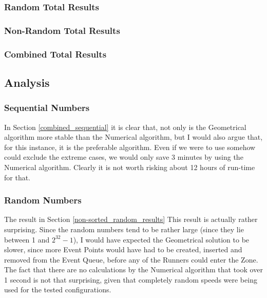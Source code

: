 \subsubsection{Random Total Results}



\subsubsection{Non-Random Total Results}



\subsubsection{Combined Total Results}
\label{total_combined_results} 


\subsection{Analysis}

\subsubsection{Sequential Numbers}
In Section \ref{combined_sequential} it is clear that, not only is the Geometrical algorithm more stable than the Numerical algorithm, but I would also argue that, for this instance, it is the preferable algorithm. Even if we were to use somehow could exclude the extreme cases, we would only save 3 minutes by using the Numerical algorithm. Clearly it is not worth risking about 12 hours of run-time for that. 

\subsubsection{Random Numbers}
The result in Section \ref{non-sorted_random_results} This result is actually rather surprising. Since the random numbers tend to be rather large (since they lie between 1 and $2^{32} - 1$), I would have expected the Geometrical solution to be slower, since more Event Points would have had to be created, inserted and removed from the Event Queue, before any of the Runners could enter the Zone. The fact that there are no calculations by the Numerical algorithm that took over 1 second is not that surprising, given that completely random speeds were being used for the tested configurations.\\


